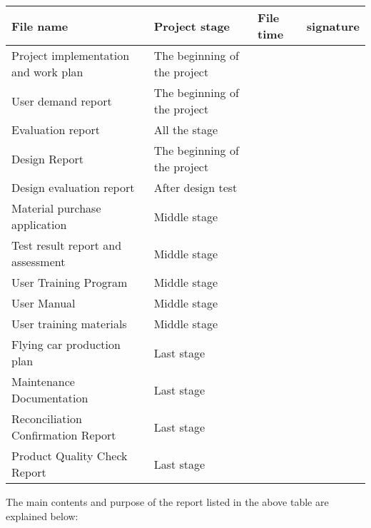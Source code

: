\renewcommand\arraystretch{1.2}
\begin{table}[H]
\centering
\footnotesize
\begin{tabular}[b]{|p{5cm}<{\raggedright}|p{5cm}<{\raggedright}|p{2cm}<{\raggedright}|p{2cm}<{\raggedright}|}
\hline
File name &	Project stage &	File time &	signature \\
\hline
Project implementation and work plan & 	The beginning of the project & &	\\
\hline	
User demand report & 	The beginning of the project &  &		\\
\hline
Evaluation report	 & All the stage & &		\\
\hline
Design Report & 	The beginning of the project & &	\\
\hline	
Design evaluation report	 & After design test &  &		\\
\hline
Material purchase application & 	Middle stage &  &		\\
\hline
Test result report and assessment	 & Middle stage &  &	\\
\hline	
User Training Program & 	Middle stage &  &		\\
\hline
User Manual	 & Middle stage &  &		\\
\hline
User training materials & 	Middle stage &  &		\\
\hline
Flying car production plan & 	Last stage &  &		\\
\hline
Maintenance Documentation & 	Last stage	 &  &	\\
\hline
Reconciliation Confirmation Report & 	Last stage &  &		\\
\hline
Product Quality Check Report	 & Last stage	 &  &	\\
\hline
\end{tabular}
\end{table}

The main contents and purpose of the report listed in the above table are explained below:

